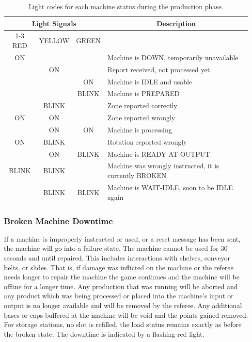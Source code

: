 \documentclass[12pt,twoside]{article}
\begin{document}
\begin{table}
  \begin{tabular}{c|c|c||l}
    \hline
    \multicolumn{3}{c||}{\bf{Light Signals}} &
    \multicolumn{1}{c}{\bf{Description}} \\\cline{1-3}
    RED & YELLOW    & GREEN & \\\hline
    ON    &       &       & Machine is DOWN, temporarily unavailable \\
          & ON    &       & Report received, not processed yet \\
          &       & ON    & Machine is IDLE and usable  \\
          &       & BLINK & Machine is PREPARED  \\
          & BLINK &       & Zone reported correctly \\
    ON    & ON    &       & Zone reported wrongly \\
          & ON    & ON    & Machine is processing \\
    ON    & BLINK &       & Rotation reported wrongly \\
          & ON    & BLINK & Machine is READY-AT-OUTPUT \\
    BLINK & BLINK &       & Machine was wrongly instructed, it is currently
    BROKEN \\
          & BLINK & BLINK & Machine is WAIT-IDLE, soon to be IDLE again \\
  \end{tabular}
  \caption{Light codes for each machine status during the production phase.}
  \label{tab:machine-lights}
\end{table}

\subsubsection{Broken Machine Downtime}
\label{sec:broken-machine}
If a machine is improperly instructed or used, or a reset message has
been sent, the machine will go into a failure state. The machine cannot be
used for 30 seconds and until repaired. This includes interactions with shelves,
conveyor belts, or slides.
That is, if damage was
inflicted on the machine or the referee needs longer to repair the
machine the game continues and the machine will be offline for a
longer time. Any production that was running will be aborted and any
product which was being processed or placed into the machine's input or output
is no longer available and will be removed by the referee. Any additional bases
or caps buffered at the machine will be void and the points gained removed.
For storage stations, no slot is refilled, the load status remains exactly as
before the broken state. The downtime is indicated by a flashing red light.
\end{document}
